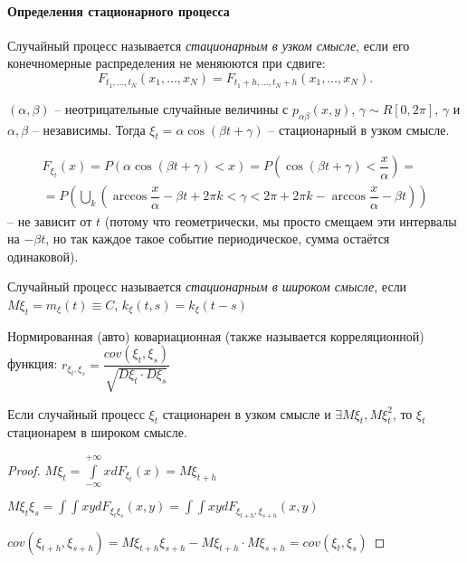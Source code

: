 \paragraph{Определения стационарного процесса}

\begin{definition}
  Случайный процесс называется \emph{стационарным в узком смысле}, если его конечномерные
  распределения не меняюются при сдвиге:
  \[
    F_{t_1, \dots, t_N}(x_1, \dots, x_N) = F_{t_1+h, \dots, t_N+h} (x_1, \dots, x_N).
  \]
\end{definition}

\begin{ex}
  $(\alpha, \beta)$ -- неотрицательные случайные величины с $p_{\alpha\beta} (x, y)$,
  $\gamma\sim R[0, 2\pi]$, $\gamma$ и $\alpha,\beta$ -- независимы.
  Тогда $\xi_t = \alpha \cos(\beta t + \gamma)$ -- стационарный в узком смысле.

  \begin{multline*}
    F_{\xi_t}(x)
    = P(\alpha \cos(\beta t + \gamma) < x)
    = P(\cos(\beta t + \gamma) < \dfrac{x}{\alpha}) = \\
    = P\left( \bigcup_k \left( \arccos\dfrac{x}{\alpha} - \beta t + 2\pi k < \gamma < 2\pi +2\pi k - \arccos\dfrac{x}{\alpha} - \beta t \right) \right)
  \end{multline*}
  -- не зависит от $t$ (потому что геометрически, мы просто смещаем эти интервалы на $-\beta t$,
  но так каждое такое событие периодическое, сумма остаётся одинаковой).
  
\end{ex}

\begin{definition}
  Случайный процесс называется \emph{стационарным в широком смысле}, если 
  $M\xi_t = m_\xi(t) \equiv C$, $k_\xi(t, s) = k_\xi(t-s)$
\end{definition}

\begin{definition}
  Нормированная (авто) ковариационная (также называется корреляционной) функция:
  $r_{\xi_t, \xi_s} = \dfrac{cov(\xi_t, \xi_s)}{\sqrt{D\xi_t \cdot D\xi_s}}$
\end{definition}

\begin{theorem}
  Если случайный процесс $\xi_t$ стационарен в узком смысле и $\exists M\xi_t, M\xi^2_t$, 
  то $\xi_t$ стационарем в широком смысле.
\end{theorem}
\begin{proof}
  $M\xi_t = \int\limits_{-\infty}^{+\infty} x dF_{\xi_t} (x) = M\xi_{t+h}$

  $M\xi_t \xi_s = \int\int xy dF_{\xi_t \xi_s} (x, y) = \int\int xy dF_{\xi_{t+h}, \xi_{s+h}} (x, y)$

  $cov(\xi_{t+h}, \xi_{s+h}) = M\xi_{t+h} \xi_{s+h} - M\xi_{t+h} \cdot M\xi_{s+h} = cov(\xi_t, \xi_s)$
\end{proof}



